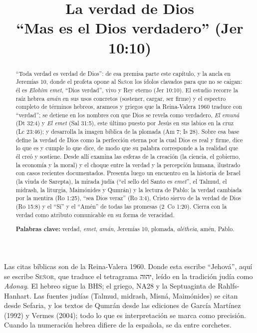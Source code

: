 \documentclass[11pt,letterpaper]{article}
\title{\color{azul}\bfseries La verdad de Dios\\[4pt]\large\color{gris}\mdseries ``Mas \SENOR{} es el Dios verdadero'' (Jer 10:10)}
\author{}\date{}
\newcommand{\heb}[1]{\mbox{\foreignlanguage{hebrew}{#1}}}
\newcommand{\SENOR}{\textsc{Señor}}
\begin{document}
\maketitle\thispagestyle{empty}

\begin{abstract}\noindent
``Toda verdad es verdad de Dios'': de esa premisa parte este capítulo, y la ancla en Jeremías 10, donde el profeta opone al \SENOR{} los ídolos clavados para que no se caigan: él es \emph{Elohim emet}, ``Dios verdad'', vivo y Rey eterno (Jer 10:10). El estudio recorre la raíz hebrea \emph{amán} en sus usos concretos (sostener, cargar, ser firme) y el espectro completo de términos hebreos, arameos y griegos que la Reina-Valera 1960 traduce con ``verdad''; se detiene en los nombres con que Dios se revela como verdadero, \emph{El emuná} (Dt 32:4) y \emph{El emet} (Sal 31:5), este último puesto por Jesús en sus labios en la cruz (Lc 23:46); y desarrolla la imagen bíblica de la plomada (Am 7; Is 28). Sobre esa base define la verdad de Dios como la perfección eterna por la cual Dios es real y firme, dice lo que es y cumple lo que dice, de modo que su palabra corresponde a la realidad que él creó y sostiene. Desde allí examina las esferas de la creación (la ciencia, el gobierno, la economía y la moral) y el choque entre la verdad y la percepción humana, ilustrado con casos recientes documentados. Presenta luego un encuentro en la historia de Israel (la viuda de Sarepta), la mirada judía (``el sello del Santo es \emph{emet}'', el Talmud, el midrash, la liturgia, Maimónides y Qumrán) y la lectura de Pablo: la verdad cambiada por la mentira (Ro 1:25), ``sea Dios veraz'' (Ro 3:4), Cristo siervo de la verdad de Dios (Ro 15:8) y el ``Sí'' y el ``Amén'' de todas las promesas (2~Co 1:20). Cierra con la verdad como atributo comunicable en su forma de veracidad.
\par\smallskip\noindent\textbf{Palabras clave:} verdad, \emph{emet}, \emph{amán}, Jeremías 10, plomada, \emph{alétheia}, amén, Pablo.\end{abstract}

\begin{nota}
Las citas bíblicas son de la Reina-Valera 1960. Donde esta escribe ``Jehová'', aquí se escribe \SENOR, que traduce el tetragrama \heb{יהוה}, leído en la tradición judía como \emph{Adonay}. El hebreo sigue la BHS; el griego, NA28 y la Septuaginta de Rahlfs-Hanhart. Las fuentes judías (Talmud, midrash, Misná, Maimónides) se citan desde Sefaria, y los textos de Qumrán desde las ediciones de García Martínez (1992) y Vermes (2004); todo lo que es interpretación se marca como precisión. Cuando la numeración hebrea difiere de la española, se da entre corchetes.
\end{nota}
\end{document}
